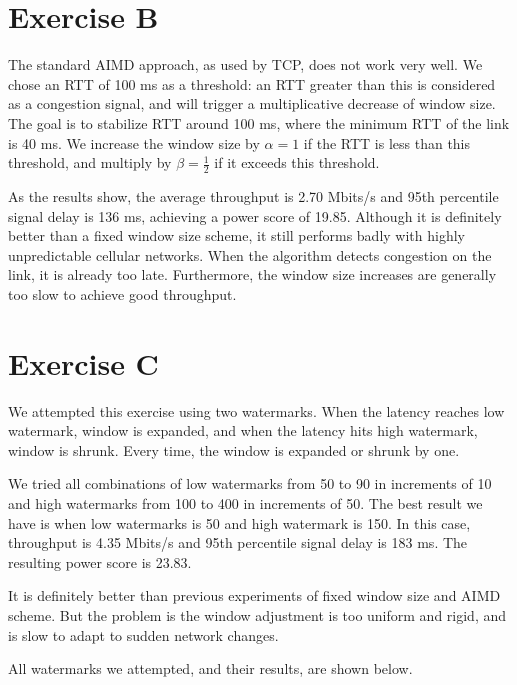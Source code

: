 \documentclass{article}
\begin{document}
\section*{Exercise B}
The standard AIMD approach, as used by TCP, does not work very well. We chose an RTT of 100 ms as a threshold: an RTT greater than this is considered as a congestion signal, and will trigger a multiplicative decrease of window size. The goal is to stabilize RTT around 100 ms, where the minimum RTT of the link is 40 ms. We increase the window size by $\alpha=1$ if the RTT is less than this threshold, and multiply by $\beta=\frac{1}{2}$ if it exceeds this threshold.

As the results show, the average throughput is 2.70 Mbits/s and 95th percentile signal delay is 136 ms, achieving a power score of 19.85. Although it is definitely better than a fixed window size scheme, it still performs badly with highly unpredictable cellular networks. When the algorithm detects congestion on the link, it is already too late. Furthermore, the window size increases are generally too slow to achieve good throughput.

\section*{Exercise C}
We attempted this exercise using two watermarks. When the latency reaches low watermark, window is expanded, and when the latency hits high watermark, window is shrunk. Every time, the window is expanded or shrunk by one.

We tried all combinations of low watermarks from 50 to 90 in increments of 10 and high watermarks from 100 to 400 in increments of 50. The best result we have is when low watermarks is 50 and high watermark is 150. In this case, throughput is 4.35 Mbits/s and 95th percentile signal delay is 183 ms. The resulting power score is 23.83.

It is definitely better than previous experiments of fixed window size and AIMD scheme. But the problem is the window adjustment is too uniform and rigid, and is slow to adapt to sudden network changes.

All watermarks we attempted, and their results, are shown below.
\end{document}
